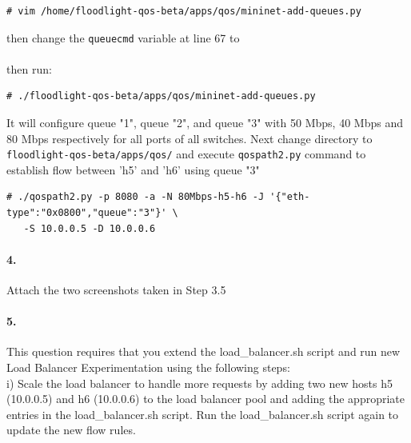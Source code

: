 \documentclass[a4paper]{article}
\begin{document}
\begin{verbatim}
# vim /home/floodlight-qos-beta/apps/qos/mininet-add-queues.py
\end{verbatim}
then change the \texttt{queuecmd} variable at line 67 to \\

\small{} \\

\noindent then run:
\begin{verbatim}
# ./floodlight-qos-beta/apps/qos/mininet-add-queues.py
\end{verbatim}

It will configure queue "1", queue "2", and queue "3" with 50 Mbps, 40 Mbps and 80 Mbps respectively for all ports of all switches. Next change directory to \texttt{floodlight-qos-beta/apps/qos/} and execute \texttt{qospath2.py} command to establish flow between 'h5' and 'h6' using queue "3"
\begin{verbatim}
# ./qospath2.py -p 8080 -a -N 80Mbps-h5-h6 -J '{"eth-type":"0x0800","queue":"3"}' \
   -S 10.0.0.5 -D 10.0.0.6
\end{verbatim}

\paragraph{4. } Attach the two screenshots taken in Step 3.5

\paragraph{5. } This question requires that you extend the load\_balancer.sh script and run new Load Balancer Experimentation using the following steps: \\

i) Scale the load balancer to handle more requests by adding two new hosts h5 (10.0.0.5) and h6 (10.0.0.6) to the load balancer pool and adding the appropriate entries in the load\_balancer.sh script. Run the load\_balancer.sh script again to update the new flow rules. \\
\end{document}
